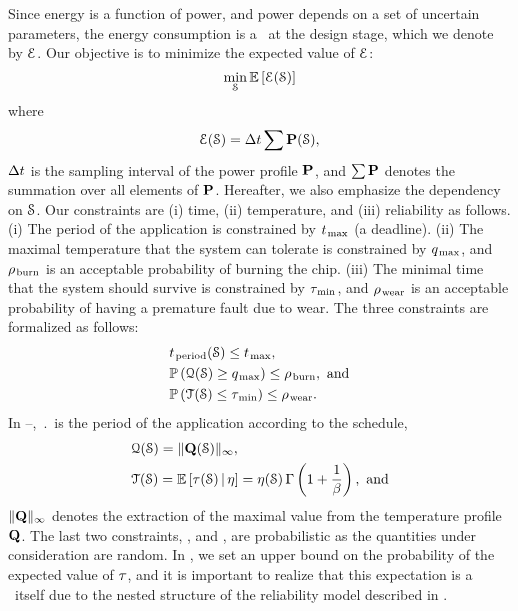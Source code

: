 Since energy is a function of power, and power depends on a set of uncertain parameters, the energy consumption is a \rv\ at the design stage, which we denote by $\qoiE$.
Our objective is to minimize the expected value of $\qoiE$:
\begin{equation} \elab{objective}
  \min_{\schedule} \expectation{\qoiE(\schedule)}
\end{equation}
where
\[
  \qoiE(\schedule) = \dt \sum \mP(\schedule),
\]
$\dt$ is the sampling interval of the power profile $\mP$, and $\sum \mP$ denotes the summation over all elements of $\mP$.
Hereafter, we also emphasize the dependency on $\schedule$.
Our constraints are (i) time, (ii) temperature, and (iii) reliability as follows.
(i) The period of the application is constrained by $\t_\maximal$ (a deadline).
(ii) The maximal temperature that the system can tolerate is constrained by $\q_\maximal$, and $\pr_\burn$ is an acceptable probability of burning the chip.
(iii) The minimal time that the system should survive is constrained by $\T_\minimal$, and $\pr_\wear$ is an acceptable probability of having a premature fault due to wear.
The three constraints are formalized as follows:
\begin{align}
  & \period(\schedule) \leq \t_\maximal, \elab{timing-constraint} \\
  & \probabilityMeasure\left( \qoiQ(\schedule) \geq \q_\maximal \right) \leq \pr_\burn, \text{ and} \elab{thermal-constraint} \\
  & \probabilityMeasure\left( \qoiT(\schedule) \leq \T_\minimal \right) \leq \pr_\wear. \elab{reliability-constraint}
\end{align}
In --, $\period$ is the period of the application according to the schedule,
\begin{align*}
  & \qoiQ(\schedule) = \norm[\infty]{\mQ(\schedule)}, \\
  & \qoiT(\schedule) = \expectation{\T(\schedule) \, | \, \eta} = \eta(\schedule) \, \Gamma\left(1 + \frac{1}{\beta}\right), \text{ and}
\end{align*}
$\norm[\infty]{\mQ}$ denotes the extraction of the maximal value from the temperature profile $\mQ$.
The last two constraints, \ie,  and , are probabilistic as the quantities under consideration are random.
In , we set an upper bound on the probability of the expected value of $\T$, and it is important to realize that this expectation is a \rv\ itself due to the nested structure of the reliability model described in .
